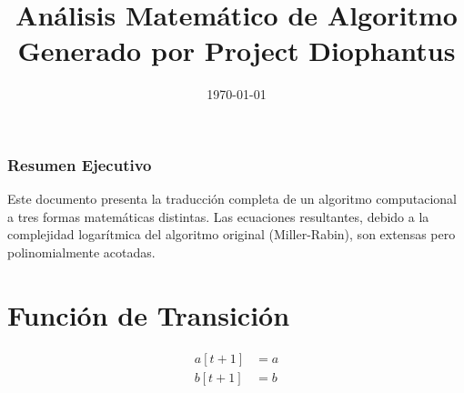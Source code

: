 \documentclass[10pt, a4paper]{article}
\title{Análisis Matemático de Algoritmo \\ \large Generado por Project Diophantus}
\author{}
\date{\today}
\begin{document}
\maketitle
\section*{Resumen Ejecutivo}
Este documento presenta la traducción completa de un algoritmo computacional a tres formas matemáticas distintas.
Las ecuaciones resultantes, debido a la complejidad logarítmica del algoritmo original (Miller-Rabin), son extensas pero polinomialmente acotadas.
\part{Función de Transición}
\begin{align*}
a[t+1] &= a \\
b[t+1] &= b \\

\end{align*}
\end{document}
